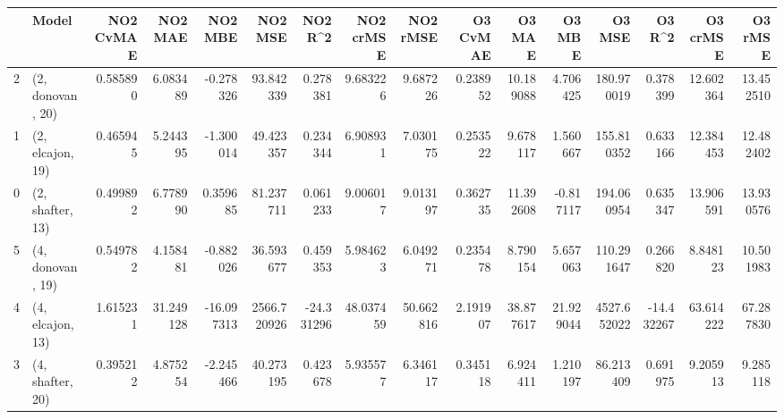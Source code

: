 \begin{tabular}{llrrrrrrrrrrrrrr}
\toprule
{} &             Model &  NO2 CvMAE &    NO2 MAE &    NO2 MBE &      NO2 MSE &    NO2 R\textasciicircum2 &  NO2 crMSE &   NO2 rMSE &  O3 CvMAE &     O3 MAE &     O3 MBE &       O3 MSE &     O3 R\textasciicircum2 &   O3 crMSE &    O3 rMSE \\
\midrule
2 &  (2, donovan, 20) &   0.585890 &   6.083489 &  -0.278326 &    93.842339 &   0.278381 &   9.683226 &   9.687226 &  0.238952 &  10.189088 &   4.706425 &   180.970019 &   0.378399 &  12.602364 &  13.452510 \\
1 &  (2, elcajon, 19) &   0.465945 &   5.244395 &  -1.300014 &    49.423357 &   0.234344 &   6.908931 &   7.030175 &  0.253522 &   9.678117 &   1.560667 &   155.810352 &   0.633166 &  12.384453 &  12.482402 \\
0 &  (2, shafter, 13) &   0.499892 &   6.778990 &   0.359685 &    81.237711 &   0.061233 &   9.006017 &   9.013197 &  0.362735 &  11.392608 &  -0.817117 &   194.060954 &   0.635347 &  13.906591 &  13.930576 \\
5 &  (4, donovan, 19) &   0.549782 &   4.158481 &  -0.882026 &    36.593677 &   0.459353 &   5.984623 &   6.049271 &  0.235478 &   8.790154 &   5.657063 &   110.291647 &   0.266820 &   8.848123 &  10.501983 \\
4 &  (4, elcajon, 13) &   1.615231 &  31.249128 & -16.097313 &  2566.720926 & -24.331296 &  48.037459 &  50.662816 &  2.191907 &  38.877617 &  21.929044 &  4527.652022 & -14.432267 &  63.614222 &  67.287830 \\
3 &  (4, shafter, 20) &   0.395212 &   4.875254 &  -2.245466 &    40.273195 &   0.423678 &   5.935577 &   6.346117 &  0.345118 &   6.924411 &   1.210197 &    86.213409 &   0.691975 &   9.205913 &   9.285118 \\
\bottomrule
\end{tabular}
